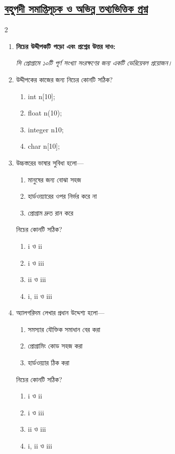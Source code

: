 \subsection*{\textbf{\underline{বহুপদী সমাপ্তিসূচক ও অভিন্ন তথ্যভিত্তিক প্রশ্ন}}}

\begin{multicols}{2}
\begin{enumerate}[resume]

\item \textbf{নিচের উদ্দীপকটি পড়ো এবং প্রশ্নের উত্তর দাও:}

\textit{সি প্রোগ্রামে ১০টি পূর্ণ সংখ্যা সংরক্ষণের জন্য একটি ভেরিয়েবল প্রয়োজন।}

\item উদ্দীপকের কাজের জন্য নিচের কোনটি সঠিক?
\begin{enumerate}[label=\alph*)]
\item int n[10]; \checkmark
\item float n(10);
\item integer n{10};
\item char n[10];
\end{enumerate}

\item উচ্চস্তরের ভাষার সুবিধা হলো—
\begin{enumerate}[label=\Roman*.]
\item মানুষের জন্য বোঝা সহজ
\item হার্ডওয়্যারের ওপর নির্ভর করে না
\item প্রোগ্রাম দ্রুত রান করে
\end{enumerate}

নিচের কোনটি সঠিক?
\begin{enumerate}[label=\alph*)]
\item i ও ii \checkmark
\item i ও iii
\item ii ও iii
\item i, ii ও iii
\end{enumerate}

\item অ্যালগরিদম লেখার প্রধান উদ্দেশ্য হলো—
\begin{enumerate}[label=\Roman*.]
\item সমস্যার যৌক্তিক সমাধান বের করা
\item প্রোগ্রামিং কোড সহজ করা
\item হার্ডওয়্যার ঠিক করা
\end{enumerate}

নিচের কোনটি সঠিক?
\begin{enumerate}[label=\alph*)]
\item i ও ii \checkmark
\item i ও iii
\item ii ও iii
\item i, ii ও iii
\end{enumerate}

\end{enumerate}
\end{multicols}
